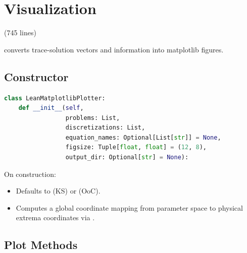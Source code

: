 \section{Visualization}
\label{sec:visualization}

\begin{center}
 \quad(745 lines)
\end{center}

 converts trace-solution vectors and
 information into matplotlib figures.

\subsection{Constructor}

\begin{lstlisting}[language=Python, caption={LeanMatplotlibPlotter constructor}]
class LeanMatplotlibPlotter:
    def __init__(self,
                 problems: List,
                 discretizations: List,
                 equation_names: Optional[List[str]] = None,
                 figsize: Tuple[float, float] = (12, 8),
                 output_dir: Optional[str] = None):
\end{lstlisting}

\noindent On construction:
\begin{itemize}
  \item Defaults  to  (KS) or  (OoC).
  \item Computes a global coordinate mapping from parameter space to
        physical extrema coordinates via .
\end{itemize}

\subsection{Plot Methods}


